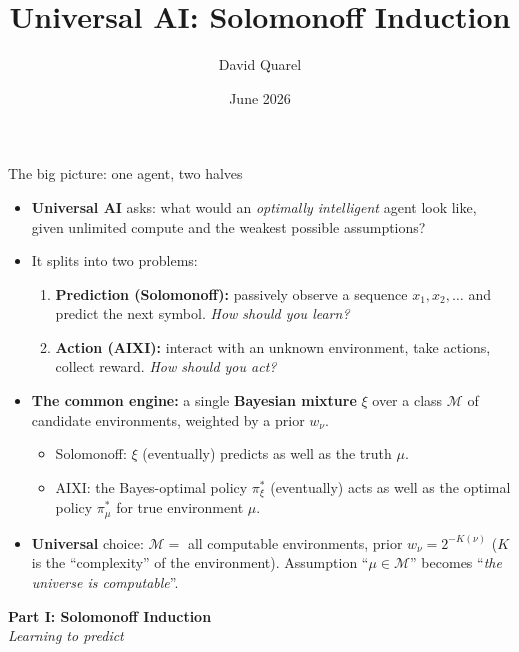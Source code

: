 \documentclass[10pt,aspectratio=169]{beamer}
\newcommand{\cM}{\mathcal{M}}
\begin{document}
\title[Solomonoff: a speedrun]{Universal AI: Solomonoff Induction}
\author[David Quarel]{David Quarel}
\date{June 2026}

\frame{\titlepage}

\begin{frame}{The big picture: one agent, two halves}
\begin{itemize}
    \item \textbf{Universal AI} asks: what would an \emph{optimally intelligent} agent look like, given unlimited compute and the weakest possible assumptions?
    \pause
    \item It splits into two problems:
    \begin{enumerate}
        \item \textbf{Prediction (Solomonoff):} passively observe a sequence $x_1, x_2, \ldots$ and predict the next symbol. \emph{How should you learn?}
        \pause
        \item \textbf{Action (AIXI):} interact with an unknown environment, take actions, collect reward. \emph{How should you act?}
    \end{enumerate}
    \pause
    \item \textbf{The common engine:} a single \textbf{Bayesian mixture} $\xi$ over a class $\cM$ of candidate environments, weighted by a prior $w_\nu$.
    \begin{itemize}
        \item Solomonoff: $\xi$ (eventually) predicts as well as the truth $\mu$.
        \item AIXI: the Bayes-optimal policy $\pi_\xi^*$ (eventually) acts as well as the optimal policy $\pi_\mu^*$ for true environment $\mu$.
    \end{itemize}
    \pause
    \item \textbf{Universal} choice: $\cM=$ all computable environments, prior $w_\nu = 2^{-K(\nu)}$ ($K$ is the ``complexity'' of the environment). Assumption ``$\mu\in\cM$'' becomes ``\emph{the universe is computable}''.
\end{itemize}
\end{frame}

\begin{frame}
    \begin{center}
    {\Huge \textbf{Part I: Solomonoff Induction}}\\[1em]
    {\large \emph{Learning to predict}}\\[2em]
    \end{center}
    \end{frame}
\end{document}
